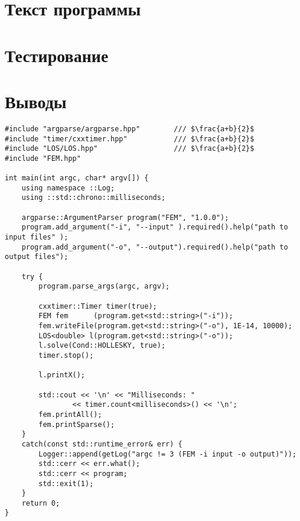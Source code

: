 \documentclass[12pt,a4paper]{article}
\begin{document}
\section{Текст программы}

\section{Тестирование}

\section{Выводы}

\begin{verbatim}
#include "argparse/argparse.hpp"        /// $\frac{a+b}{2}$
#include "timer/cxxtimer.hpp"           /// $\frac{a+b}{2}$
#include "LOS/LOS.hpp"                  /// $\frac{a+b}{2}$
#include "FEM.hpp"

int main(int argc, char* argv[]) {
    using namespace ::Log;
    using ::std::chrono::milliseconds;

    argparse::ArgumentParser program("FEM", "1.0.0");
    program.add_argument("-i", "--input" ).required().help("path to input files" );
    program.add_argument("-o", "--output").required().help("path to output files");

    try {
        program.parse_args(argc, argv);

        cxxtimer::Timer timer(true);
        FEM fem      (program.get<std::string>("-i"));
        fem.writeFile(program.get<std::string>("-o"), 1E-14, 10000);
        LOS<double> l(program.get<std::string>("-o"));
        l.solve(Cond::HOLLESKY, true);
        timer.stop();

        l.printX();

        std::cout << '\n' << "Milliseconds: "
                << timer.count<milliseconds>() << '\n';
        fem.printAll();
        fem.printSparse();
    }
    catch(const std::runtime_error& err) {
        Logger::append(getLog("argc != 3 (FEM -i input -o output)"));
        std::cerr << err.what();
        std::cerr << program;
        std::exit(1);
    }
    return 0;
}
\end{verbatim}
\end{document}
